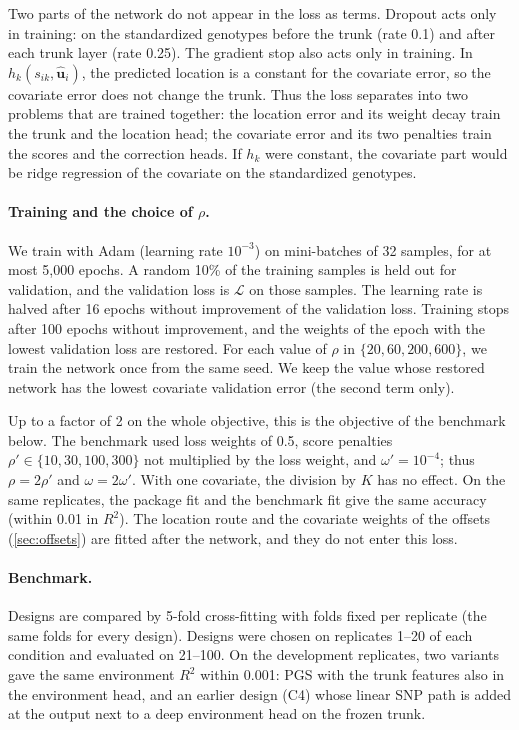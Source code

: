 Two parts of the network do not appear in the loss as terms. Dropout acts
only in training: on the standardized genotypes before the trunk (rate
0.1) and after each trunk layer (rate 0.25). The gradient stop also acts
only in training. In $h_k(s_{ik}, \hat{\mathbf{u}}_i)$, the predicted
location is a constant for the covariate error, so the covariate error
does not change the trunk. Thus the loss separates into two problems that
are trained together: the location error and its weight decay train the
trunk and the location head; the covariate error and its two penalties
train the scores and the correction heads. If $h_k$ were constant,
the covariate part would be ridge regression of the covariate on the
standardized genotypes.

\paragraph{Training and the choice of $\rho$.} We train with Adam
(learning rate $10^{-3}$) on mini-batches of 32 samples, for at most 5,000
epochs. A random 10\% of the training samples is held out for validation,
and the validation loss is $\mathcal{L}$ on those samples. The learning
rate is halved after 16 epochs without improvement of the validation
loss. Training stops after 100 epochs without improvement, and the weights
of the epoch with the lowest validation loss are restored. For each value
of $\rho$ in $\{20, 60, 200, 600\}$, we train the network once from the
same seed. We keep the value whose restored network has the lowest
covariate validation error (the second term only).

Up to a factor of 2 on the whole objective, this is the objective of the
benchmark below. The benchmark used loss weights of 0.5, score penalties
$\rho' \in \{10, 30, 100, 300\}$ not multiplied by the loss weight, and
$\omega' = 10^{-4}$; thus $\rho = 2\rho'$ and $\omega = 2\omega'$. With one
covariate, the division by $K$ has no effect. On the same replicates, the
package fit and the benchmark fit give the same accuracy (within 0.01 in
$R^2$). The location route and the covariate weights of the offsets
(\cref{sec:offsets}) are fitted after the network, and they do not enter
this loss.

\paragraph{Benchmark.} Designs are compared by 5-fold cross-fitting with
folds fixed per replicate (the same folds for every design). Designs were
chosen on replicates 1--20 of each condition and evaluated on 21--100.
On the development replicates, two variants gave the same environment
$R^2$ within 0.001: PGS with the trunk features also in the environment
head, and an earlier design (C4) whose linear SNP path is added at the
output next to a deep environment head on the frozen trunk.

